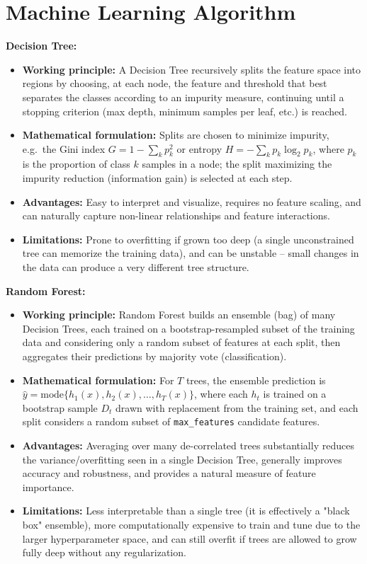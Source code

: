 \documentclass[12pt,a4paper]{article}
\begin{document}
\section{Machine Learning Algorithm}

\textbf{Decision Tree:}
\begin{itemize}
\item \textbf{Working principle:} A Decision Tree recursively splits the feature space into regions by choosing, at each node, the feature and threshold that best separates the classes according to an impurity measure, continuing until a stopping criterion (max depth, minimum samples per leaf, etc.) is reached.
\item \textbf{Mathematical formulation:} Splits are chosen to minimize impurity, e.g.\ the Gini index $G = 1-\sum_{k}p_k^2$ or entropy $H = -\sum_{k}p_k\log_2 p_k$, where $p_k$ is the proportion of class $k$ samples in a node; the split maximizing the impurity reduction (information gain) is selected at each step.
\item \textbf{Advantages:} Easy to interpret and visualize, requires no feature scaling, and can naturally capture non-linear relationships and feature interactions.
\item \textbf{Limitations:} Prone to overfitting if grown too deep (a single unconstrained tree can memorize the training data), and can be unstable -- small changes in the data can produce a very different tree structure.
\end{itemize}

\textbf{Random Forest:}
\begin{itemize}
\item \textbf{Working principle:} Random Forest builds an ensemble (bag) of many Decision Trees, each trained on a bootstrap-resampled subset of the training data and considering only a random subset of features at each split, then aggregates their predictions by majority vote (classification).
\item \textbf{Mathematical formulation:} For $T$ trees, the ensemble prediction is $\hat{y} = \text{mode}\{h_1(x), h_2(x), \dots, h_T(x)\}$, where each $h_t$ is trained on a bootstrap sample $D_t$ drawn with replacement from the training set, and each split considers a random subset of \texttt{max\_features} candidate features.
\item \textbf{Advantages:} Averaging over many de-correlated trees substantially reduces the variance/overfitting seen in a single Decision Tree, generally improves accuracy and robustness, and provides a natural measure of feature importance.
\item \textbf{Limitations:} Less interpretable than a single tree (it is effectively a "black box" ensemble), more computationally expensive to train and tune due to the larger hyperparameter space, and can still overfit if trees are allowed to grow fully deep without any regularization.
\end{itemize}
\end{document}
